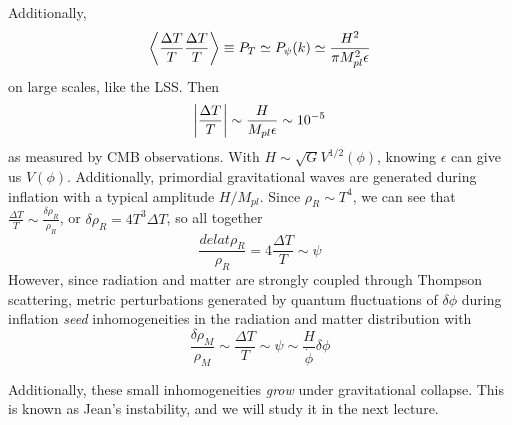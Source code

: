 \documentclass[a4paper,twoside,master.tex]{subfiles}
\begin{document}
Additionally,
\begin{equation}
    \ev{\frac{\Delta T}{T} \frac{\Delta T}{T}} \equiv P_T \simeq P_{\psi}(k) \simeq \frac{H^2}{\pi M_{pl}^2 \epsilon}
\end{equation}
on large scales, like the LSS. Then
\begin{equation}
    \abs{\frac{\Delta T}{T}} \sim \frac{H}{M_{pl} \epsilon} \sim 10^{-5}
\end{equation}
as measured by CMB observations. With $ H \sim \sqrt{G} V^{1/2}(\phi) $, knowing $ \epsilon $ can give us $ V(\phi) $. Additionally, primordial gravitational waves are generated during inflation with a typical amplitude $ H/M_{pl} $. Since $ \rho_R \sim T^4 $, we can see that $ \frac{\Delta T}{T} \sim \frac{\delta \rho_R}{\rho_R} $, or $ \delta \rho_R = 4 T^3 \Delta T $, so all together
\begin{equation}
    \frac{delat \rho_R}{\rho_R} = 4 \frac{\Delta T}{T} \sim \psi
\end{equation}
However, since radiation and matter are strongly coupled through Thompson scattering, metric perturbations generated by quantum fluctuations of $ \delta \phi $ during inflation \textit{seed} inhomogeneities in the radiation and matter distribution with
\begin{equation}
    \frac{\delta \rho_M}{\rho_M} \sim \frac{\Delta T}{T} \sim \psi \sim \frac{H}{\dot{\phi}} \delta \phi
\end{equation}

Additionally, these small inhomogeneities \textit{grow} under gravitational collapse. This is known as Jean's instability, and we will study it in the next lecture.
\end{document}
